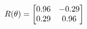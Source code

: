 \documentclass[preview]{standalone}
\begin{document}
\begin{align*}
\special{dvisvgm:raw <g id='unique000'>}R(\theta) = \begin{bmatrix}0.96 & -0.29\\0.29 & 0.96\end{bmatrix}\special{dvisvgm:raw </g>}
\end{align*}
\end{document}
